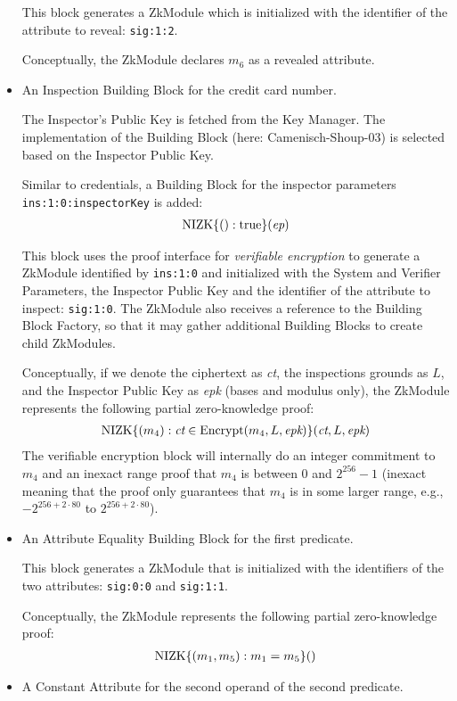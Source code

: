 \begin{itemize}
This block generates a ZkModule which is initialized with the identifier of the attribute to reveal: \texttt{sig:1:2}.

Conceptually, the ZkModule declares $m_6$ as a revealed attribute.

\item An Inspection Building Block for the credit card number.

The Inspector's Public Key is fetched from
the Key Manager. The implementation of the Building Block (here: Camenisch-Shoup-03) is selected based on the
Inspector Public Key.

Similar to credentials, a Building Block for the inspector parameters \texttt{ins:1:0:inspectorKey} is added:
\begin{align}
\operatorname{NIZK}\lbrace(): \operatorname{true}\rbrace(\emph{ep})
\end{align}


This block uses the proof interface for \emph{verifiable encryption} to generate a
ZkModule identified by \texttt{ins:1:0} and initialized with the System and Verifier
Parameters, the Inspector Public Key and the identifier of the attribute to inspect: \texttt{sig:1:0}.
The ZkModule also receives a reference to the Building Block Factory, so that it may
gather additional Building Blocks to create child ZkModules.

Conceptually, if we denote the ciphertext as \emph{ct}, the inspections grounds as $L$, and the Inspector Public Key as
\emph{epk} (bases and modulus only), the ZkModule represents
the following partial zero-knowledge proof:
\begin{align}
\operatorname{NIZK}\lbrace(m_4): \emph{ct} \in \operatorname{Encrypt}(m_4, L, \emph{epk})\rbrace(\emph{ct}, L,  \emph{epk})
\end{align}
The verifiable encryption block will internally do an integer commitment to $m_4$ and an
inexact range proof that $m_4$ is between 0 and $2^{256}-1$ (inexact meaning that
the proof only guarantees that $m_4$ is in some larger range, e.g., $-2^{256+2\cdot 80}$ to $2^{256+2\cdot 80}$).

\item An Attribute Equality Building Block for the first predicate.

This block generates a ZkModule that is initialized with the identifiers of the two attributes: \texttt{sig:0:0} and \texttt{sig:1:1}.

Conceptually, the ZkModule represents
the following partial zero-knowledge proof:
\begin{align}
\operatorname{NIZK}\lbrace(m_1, m_5): m_1 = m_5\rbrace()
\end{align}
\item A Constant Attribute for the second operand of the second predicate.


\end{itemize}
